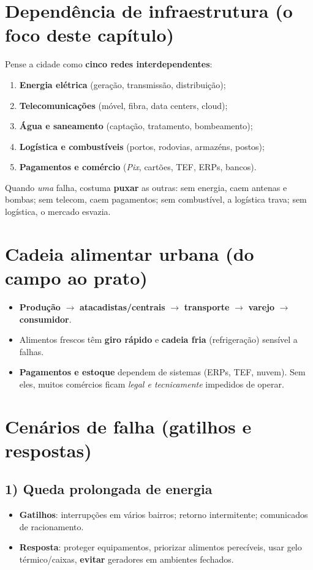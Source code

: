 \section{Dependência de infraestrutura (o foco deste capítulo)}
Pense a cidade como \textbf{cinco redes interdependentes}:
\begin{enumerate}[leftmargin=*,nosep]
  \item \textbf{Energia elétrica} (geração, transmissão, distribuição);
  \item \textbf{Telecomunicações} (móvel, fibra, data centers, cloud);
  \item \textbf{Água e saneamento} (captação, tratamento, bombeamento);
  \item \textbf{Logística e combustíveis} (portos, rodovias, armazéns, postos);
  \item \textbf{Pagamentos e comércio} (\emph{Pix}, cartões, TEF, ERPs, bancos).
\end{enumerate}
Quando \emph{uma} falha, costuma \textbf{puxar} as outras: sem energia, caem antenas e bombas; sem telecom, caem pagamentos; sem combustível, a logística trava; sem logística, o mercado esvazia.

\section{Cadeia alimentar urbana (do campo ao prato)}
\begin{itemize}[leftmargin=*,noitemsep]
  \item \textbf{Produção} $\rightarrow$ \textbf{atacadistas/centrais} $\rightarrow$ \textbf{transporte} $\rightarrow$ \textbf{varejo} $\rightarrow$ \textbf{consumidor}.
  \item Alimentos frescos têm \textbf{giro rápido} e \textbf{cadeia fria} (refrigeração) sensível a falhas.
  \item \textbf{Pagamentos e estoque} dependem de sistemas (ERPs, TEF, nuvem). Sem eles, muitos comércios ficam \emph{legal e tecnicamente} impedidos de operar.
\end{itemize}

\section{Cenários de falha (gatilhos e respostas)}
\subsection*{1) Queda prolongada de energia}
\begin{itemize}[leftmargin=*,noitemsep]
  \item \textbf{Gatilhos}: interrupções em vários bairros; retorno intermitente; comunicados de racionamento.
  \item \textbf{Resposta}: proteger equipamentos, priorizar alimentos perecíveis, usar gelo térmico/caixas, \textbf{evitar} geradores em ambientes fechados.
\end{itemize}

